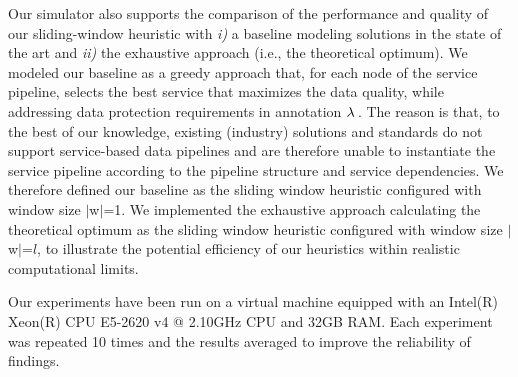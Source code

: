     Our simulator also supports the comparison of the performance and quality of our sliding-window heuristic with \emph{i)} a baseline modeling solutions in the state of the art and \emph{ii)} the exhaustive approach (i.e., the theoretical optimum). We modeled our baseline as a greedy approach that, for each node of the service pipeline, selects the best service that maximizes the data quality, while addressing data protection requirements in annotation $\lambda\,$. The reason is that, to the best of our knowledge, existing (industry) solutions and standards do not support service-based data pipelines and are therefore unable to instantiate the service pipeline according to the pipeline structure and service dependencies. We therefore defined our baseline as the sliding window heuristic configured with window size $|$w$|$=1.
    We implemented the exhaustive approach calculating the theoretical optimum as the sliding window heuristic configured with window size $|$w$|$=$l$, to illustrate the potential efficiency of our heuristics within realistic computational limits.



    Our experiments have been run on a virtual machine equipped with an Intel(R) Xeon(R) CPU E5-2620 v4 @ 2.10GHz CPU and 32GB RAM. Each experiment was repeated 10 times and the results averaged to improve the reliability of findings.

